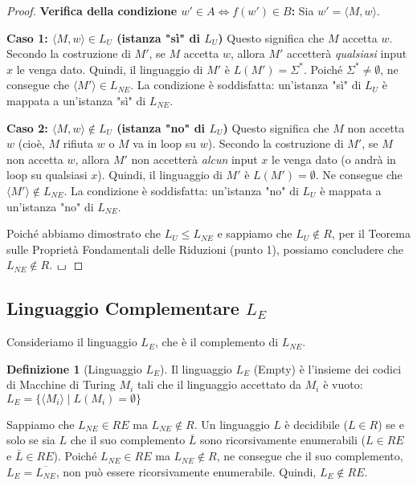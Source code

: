 \documentclass[a4paper]{article}
\newcommand{\blankS}{\ensuremath{\raisebox{-0.15ex}{\scalebox{1.3}[0.7]{$\sqcup$}}\mkern2mu}}
\theoremstyle{definition} %
\newtheorem{definition}[theorem]{Definizione}
\begin{document}
\begin{proof}
\textbf{Verifica della condizione $w' \in A \iff f(w') \in B$:}
Sia $w' = \langle M, w \rangle$.

\textbf{Caso 1: $\langle M, w \rangle \in L_U$ (istanza "sì" di $L_U$)}
Questo significa che $M$ accetta $w$.
Secondo la costruzione di $M'$, se $M$ accetta $w$, allora $M'$ accetterà \emph{qualsiasi} input $x$ le venga dato.
Quindi, il linguaggio di $M'$ è $L(M') = \Sigma^*$.
Poiché $\Sigma^* \neq \emptyset$, ne consegue che $\langle M' \rangle \in L_{NE}$.
La condizione è soddisfatta: un'istanza "sì" di $L_U$ è mappata a un'istanza "sì" di $L_{NE}$.

\textbf{Caso 2: $\langle M, w \rangle \notin L_U$ (istanza "no" di $L_U$)}
Questo significa che $M$ non accetta $w$ (cioè, $M$ rifiuta $w$ o $M$ va in loop su $w$).
Secondo la costruzione di $M'$, se $M$ non accetta $w$, allora $M'$ non accetterà \emph{alcun} input $x$ le venga dato (o andrà in loop su qualsiasi $x$).
Quindi, il linguaggio di $M'$ è $L(M') = \emptyset$.
Ne consegue che $\langle M' \rangle \notin L_{NE}$.
La condizione è soddisfatta: un'istanza "no" di $L_U$ è mappata a un'istanza "no" di $L_{NE}$.

Poiché abbiamo dimostrato che $L_U \le L_{NE}$ e sappiamo che $L_U \notin R$, per il Teorema sulle Proprietà Fondamentali delle Riduzioni (punto 1), possiamo concludere che $L_{NE} \notin R$.
$\blankS$
\end{proof}

\subsection{Linguaggio Complementare $L_E$}

Consideriamo il linguaggio $L_E$, che è il complemento di $L_{NE}$.
\begin{definition}[Linguaggio $L_E$]
Il linguaggio $L_E$ (Empty) è l'insieme dei codici di Macchine di Turing $M_i$ tali che il linguaggio accettato da $M_i$ è vuoto:
$L_E = \{ \langle M_i \rangle \mid L(M_i) = \emptyset \}$
\end{definition}

Sappiamo che $L_{NE} \in RE$ ma $L_{NE} \notin R$.
Un linguaggio $L$ è decidibile ($L \in R$) se e solo se sia $L$ che il suo complemento $\bar{L}$ sono ricorsivamente enumerabili ($L \in RE$ e $\bar{L} \in RE$).
Poiché $L_{NE} \in RE$ ma $L_{NE} \notin R$, ne consegue che il suo complemento, $L_E = \overline{L_{NE}}$, non può essere ricorsivamente enumerabile.
Quindi, $L_E \notin RE$.
\end{document}
